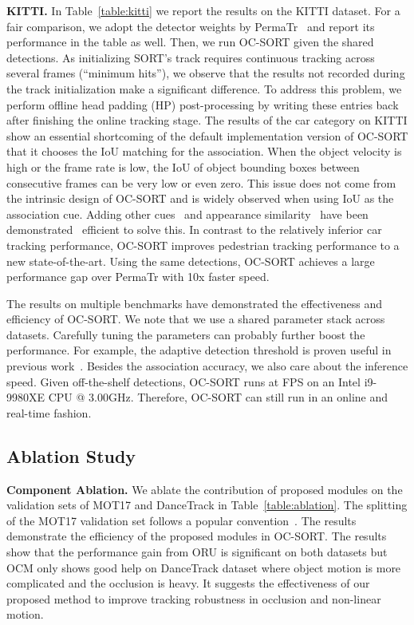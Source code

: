 \documentclass[10pt,twocolumn,letterpaper]{article}
\begin{document}
\noindent\textbf{KITTI.} In Table~\ref{table:kitti} we report the results on the KITTI dataset.  For a fair comparison, we adopt the detector weights by PermaTr~\cite{permatrack} and report its performance in the table as well. Then, we run OC-SORT given the shared detections. As initializing SORT's track requires continuous tracking across several frames (``minimum hits''), we observe that the results not recorded during the track initialization make a significant difference. To address this problem, we perform offline head padding (HP) post-processing by writing these entries back after finishing the online tracking stage. The results of the car category on KITTI show an essential shortcoming of the default implementation version of OC-SORT that it chooses the IoU matching for the association. When the object velocity is high or the frame rate is low, the IoU of object bounding boxes between consecutive frames can be very low or even zero. This issue does not come from the intrinsic design of OC-SORT and is widely observed when using IoU as the association cue. Adding other cues~\citep{diou,giou,centertrack} and appearance similarity~\citep{deepsort,maggiolino2023deep} have been demonstrated~\cite{deepsort} efficient to solve this. In contrast to the relatively inferior car tracking performance, OC-SORT improves pedestrian tracking performance to a new state-of-the-art. Using the same detections, OC-SORT achieves a large performance gap over PermaTr with 10x faster speed.

The results on multiple benchmarks have demonstrated the effectiveness and efficiency of OC-SORT. We note that we use a shared parameter stack across datasets. Carefully tuning the parameters can probably further boost the performance. For example, the adaptive detection threshold is proven useful in previous work~\cite{bytetrack}. 
Besides the association accuracy, we also care about the inference speed. Given off-the-shelf detections, OC-SORT runs at  FPS on an Intel i9-9980XE CPU @ 3.00GHz. Therefore, OC-SORT can still run in an online and real-time fashion.

\subsection{Ablation Study}
\noindent\textbf{Component Ablation.} We ablate the contribution of proposed modules on the validation sets of MOT17 and DanceTrack in Table~\ref{table:ablation}. The splitting of the MOT17 validation set follows a popular convention~\cite{centertrack}. The results demonstrate the efficiency of the proposed modules in OC-SORT. The results show that the performance gain from ORU is significant on both datasets but OCM only shows good help on DanceTrack dataset where object motion is more complicated and the occlusion is heavy. It suggests the effectiveness of our proposed method to improve tracking robustness in occlusion and non-linear motion.
\end{document}
